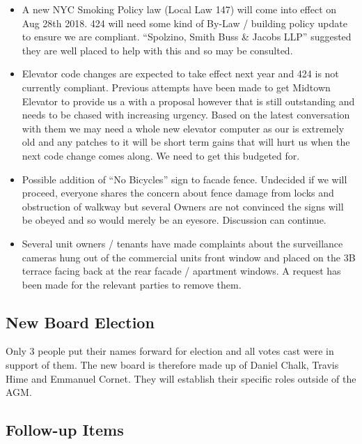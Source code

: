 \begin{itemize}
\item A new NYC Smoking Policy law (Local Law 147) will come into effect on Aug 28th 
2018.  424 will need some kind of By-Law / building policy update to ensure we 
are compliant.  “Spolzino, Smith Buss \& Jacobs LLP” suggested they are well 
placed to help with this and so may be consulted.

\item Elevator code changes are expected to take effect next year and 424 is not 
currently compliant.  Previous attempts have been made to get Midtown Elevator 
to provide us a with a proposal however that is still outstanding and needs to 
be chased with increasing urgency.  Based on the latest conversation with them 
we may need a whole new elevator computer as our is extremely old and any 
patches to it will be short term gains that will hurt us when the next code 
change comes along.  We need to get this budgeted for.

\item Possible addition of “No Bicycles” sign to facade fence.  Undecided if we will 
proceed, everyone shares the concern about fence damage from locks and 
obstruction of walkway but several Owners are not convinced the signs will be 
obeyed and so would merely be an eyesore.  Discussion can continue.

\item Several unit owners / tenants have made complaints about the surveillance 
cameras hung out of the commercial units front window and placed on the 3B 
terrace facing back at the rear facade / apartment windows.  A request has been 
made for the relevant parties to remove them.
\end{itemize}

\subsection*{New Board Election}

Only 3 people put their names forward for election and all votes cast were in 
support of them. The new board is therefore made up of Daniel Chalk, Travis Hime and Emmanuel 
Cornet. They will establish their specific roles outside of the AGM.

\subsection*{Follow-up Items}


